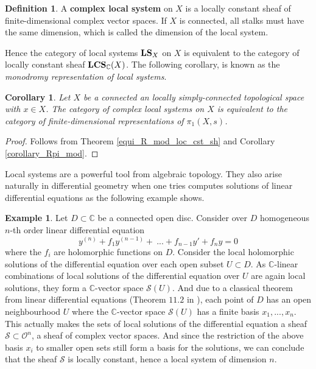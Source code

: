\documentclass{article}
\theoremstyle{plain}
\newtheorem{corollary}[theorem]{Corollary}
\theoremstyle{definition}
\newtheorem{definition}[theorem]{Definition}
\newtheorem{example}[theorem]{Example}
\DeclareMathOperator{\LCS}{\bf{LCS}}
\DeclareMathOperator{\LS}{\bf{LS}}
\begin{document}
\begin{definition}
    A \textbf{complex local system} on $X$ is a locally constant sheaf of finite-dimensional complex vector spaces. 
    If $X$ is connected, all stalks must have the same dimension, which is called the dimension of the local system.
\end{definition}

\noindent Hence the category of local systems $\LS_X$ on $X$ is equivalent to the category of locally constant sheaf $\LCS_{\mathbb{C}}(X)$.
The following corollary, is known as the \textit{monodromy representation of local systems}.

\begin{corollary}
\label{local_systems_representations}
    Let $X$ be a connected an locally simply-connected topological space with $x\in X$. 
    The category of complex local systems on $X$ is equivalent to the category of finite-dimensional representations of $\pi_1(X,s)$. 
\end{corollary}
\begin{proof}
    Follows from Theorem \ref{equi_R_mod_loc_cst_sh} and Corollary \ref{corollary_Rpi_mod}.
\end{proof}

\noindent Local systems are a powerful tool from algebraic topology. 
They also arise naturally in differential geometry when one tries computes solutions of linear differential equations as the following example shows.

\begin{example}
    Let $D\subset \mathbb{C}$ be a connected open disc.
    Consider over $D$  homogeneous $n$-th order linear differential equation
    $$y^{(n)} +f_1y^{(n-1)} +\:...+ f_{n-1}y'+f_ny = 0$$
    where the $f_i$ are holomorphic functions on $D$.
    Consider the local holomorphic solutions of the differential equation over each open subset $U\subset D$. As $\mathbb{C}$-linear combinations of local solutions of the differential equation over $U$ are again local solutions, they form a $\mathbb{C}$-vector space $\mathcal{S}(U)$.
    And due to a classical theorem from linear differential equations (Theorem $11.2$ in \cite{Forster}), each point of $D$ has an open neighbourhood $U$ where the $\mathbb{C}$-vector space $\mathcal{S}(U)$ has a finite basis $x_1,...,x_n$.
    This actually makes the sets of local solutions of the differential equation a sheaf $\mathcal{S}\subset \mathcal{O}^n$, a sheaf of complex vector spaces.
    And since the restriction of the above basis $x_i$ to smaller open sets still form a basis for the solutions, we can conclude that the sheaf $\mathcal{S}$ is locally constant, hence a local system of dimension $n$.
\end{example}
\end{document}
